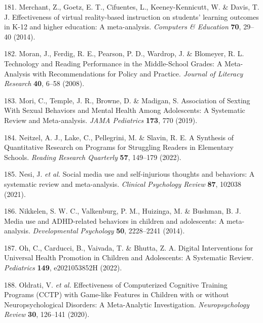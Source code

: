 \documentclass[
  english,
  man]{apa6}
\newenvironment{cslreferences}%
  {}%
  {\par}
\begin{document}
\begin{cslreferences}
\leavevmode\hypertarget{ref-merchantEffectivenessVirtualRealitybased2014}{}%
181. Merchant, Z., Goetz, E. T., Cifuentes, L., Keeney-Kennicutt, W. \& Davis, T. J. Effectiveness of virtual reality-based instruction on students' learning outcomes in K-12 and higher education: A meta-analysis. \emph{Computers \& Education} \textbf{70}, 29--40 (2014).

\leavevmode\hypertarget{ref-moranTechnologyReadingPerformance2008}{}%
182. Moran, J., Ferdig, R. E., Pearson, P. D., Wardrop, J. \& Blomeyer, R. L. Technology and Reading Performance in the Middle-School Grades: A Meta-Analysis with Recommendations for Policy and Practice. \emph{Journal of Literacy Research} \textbf{40}, 6--58 (2008).

\leavevmode\hypertarget{ref-moriAssociationSextingSexual2019}{}%
183. Mori, C., Temple, J. R., Browne, D. \& Madigan, S. Association of Sexting With Sexual Behaviors and Mental Health Among Adolescents: A Systematic Review and Meta-analysis. \emph{JAMA Pediatrics} \textbf{173}, 770 (2019).

\leavevmode\hypertarget{ref-neitzelSynthesisQuantitativeResearch2022}{}%
184. Neitzel, A. J., Lake, C., Pellegrini, M. \& Slavin, R. E. A Synthesis of Quantitative Research on Programs for Struggling Readers in Elementary Schools. \emph{Reading Research Quarterly} \textbf{57}, 149--179 (2022).

\leavevmode\hypertarget{ref-nesiSocialMediaUse2021}{}%
185. Nesi, J. \emph{et al.} Social media use and self-injurious thoughts and behaviors: A systematic review and meta-analysis. \emph{Clinical Psychology Review} \textbf{87}, 102038 (2021).

\leavevmode\hypertarget{ref-nikkelenMediaUseADHDrelated2014}{}%
186. Nikkelen, S. W. C., Valkenburg, P. M., Huizinga, M. \& Bushman, B. J. Media use and ADHD-related behaviors in children and adolescents: A meta-analysis. \emph{Developmental Psychology} \textbf{50}, 2228--2241 (2014).

\leavevmode\hypertarget{ref-ohDigitalInterventionsUniversal2022}{}%
187. Oh, C., Carducci, B., Vaivada, T. \& Bhutta, Z. A. Digital Interventions for Universal Health Promotion in Children and Adolescents: A Systematic Review. \emph{Pediatrics} \textbf{149}, e2021053852H (2022).

\leavevmode\hypertarget{ref-oldratiEffectivenessComputerizedCognitive2020}{}%
188. Oldrati, V. \emph{et al.} Effectiveness of Computerized Cognitive Training Programs (CCTP) with Game-like Features in Children with or without Neuropsychological Disorders: A Meta-Analytic Investigation. \emph{Neuropsychology Review} \textbf{30}, 126--141 (2020).


\end{cslreferences}
\end{document}
